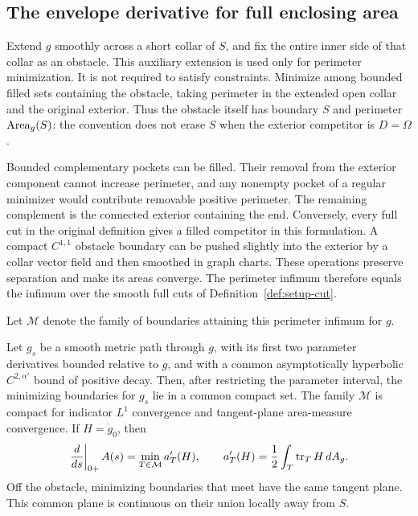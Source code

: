 \subsection{The envelope derivative for full enclosing area}

Extend \(g\) smoothly across a short collar of \(S\), and fix the entire
inner side of that collar as an obstacle.  This auxiliary extension is
used only for perimeter minimization.  It is not required to satisfy
constraints.  Minimize among bounded filled sets containing the
obstacle, taking perimeter in the extended open collar and the original
exterior.  Thus the obstacle itself has boundary \(S\) and perimeter
\(\operatorname{Area}_g(S)\): the convention does not erase \(S\) when the exterior
competitor is \(D=\Omega\).

Bounded complementary pockets can be filled.  Their removal from the
exterior component cannot increase perimeter, and any nonempty pocket
of a regular minimizer would contribute removable positive perimeter.
The remaining complement is the connected exterior containing the end.
Conversely, every full cut in the original definition gives a filled
competitor in this formulation.  A compact \(C^{1,1}\) obstacle boundary
can be pushed slightly into the exterior by a collar vector field and
then smoothed in graph charts.  These operations preserve separation
and make its areas converge.  The perimeter infimum therefore equals
the infimum over the smooth full cuts of Definition~\ref{def:setup-cut}.

Let \(\mathcal M\) denote the family of boundaries attaining this
perimeter infimum for \(g\).

\begin{lemma}
\label{eq-area-envelope}
Let \(g_s\) be a smooth metric path through \(g\), with its first two
parameter derivatives bounded relative to \(g\), and with a common
asymptotically hyperbolic \(C^{2,\alpha'}\) bound of positive decay.
Then, after restricting the parameter interval, the minimizing
boundaries for \(g_s\) lie in a common compact set.  The family
\(\mathcal M\) is compact for indicator \(L^1\) convergence and
tangent-plane area-measure convergence.  If \(H=\dot g_0\), then
\begin{equation}
 \left.\frac{d}{ds}\right|_{0+}A(s)
   =\min_{T\in\mathcal M}a'_T(H),\qquad
 a'_T(H)=\frac12\int_T\operatorname{tr}_T H\,dA_g.
 \label{eq-area-derivative}
\end{equation}
Off the obstacle, minimizing boundaries that meet have the same tangent
plane.  This common plane is continuous on their union locally away
from \(S\).
\end{lemma}

